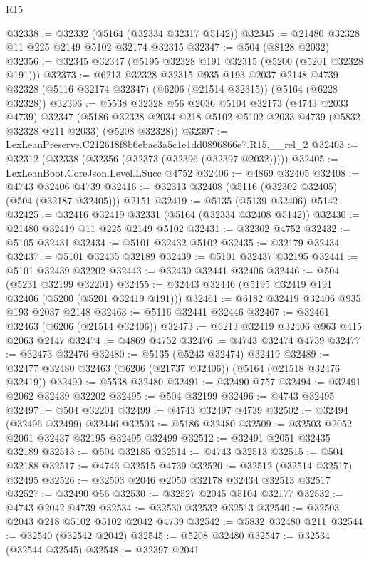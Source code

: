 \begin{lexlean}{R15}
\begin{coremodule}
{{{{{{{{{{{@32338 := @32332 (@5164 (@32334 @32317 @5142))
@32345 := @21480 @32328 @11 @225 @2149 @5102 @32174 @32315
@32347 := @504 (@8128 @2032)
@32356 := @32345 @32347 (@5195 @32328 @191 @32315 (@5200 (@5201 @32328 @191)))
@32373 := @6213
    @32328
    @32315
    @935
    @193
    @2037
    @2148
    @4739
    @32328
    (@5116 @32174 @32347)
    (@6206 (@21514 @32315))
    (@5164 (@6228 @32328))
@32396 := @5538
    @32328
    @56
    @2036
    @5104
    @32173
    (@4743 @2033 @4739)
    @32347
    (@5186 @32328 @2034 @218 @5102 @5102 @2033 @4739 (@5832 @32328 @211 @2033) (@5208 @32328))
@32397 := LexLeanPreserve.C212618f8b6ebac3a5c1e1dd0896866e7.R15.__rel_2
@32403 := @32312 (@32338 (@32356 (@32373 (@32396 (@32397 @2032)))))
@32405 := LexLeanBoot.CoreJson.Level.LSucc @4752
@32406 := @4869 @32405
@32408 := @4743 @32406 @4739
@32416 := @32313 @32408 (@5116 (@32302 @32405) (@504 (@32187 @32405))) @2151
@32419 := @5135 (@5139 @32406) @5142
@32425 := @32416 @32419 @32331 (@5164 (@32334 @32408 @5142))
@32430 := @21480 @32419 @11 @225 @2149 @5102
@32431 := @32302 @4752
@32432 := @5105 @32431
@32434 := @5101 @32432 @5102
@32435 := @32179 @32434
@32437 := @5101 @32435 @32189
@32439 := @5101 @32437 @32195
@32441 := @5101 @32439 @32202
@32443 := @32430 @32441 @32406
@32446 := @504 (@5231 @32199 @32201)
@32455 := @32443 @32446 (@5195 @32419 @191 @32406 (@5200 (@5201 @32419 @191)))
@32461 := @6182 @32419 @32406 @935 @193 @2037 @2148
@32463 := @5116 @32441 @32446
@32467 := @32461 @32463 (@6206 (@21514 @32406))
@32473 := @6213 @32419 @32406 @963 @415 @2063 @2147
@32474 := @4869 @4752
@32476 := @4743 @32474 @4739
@32477 := @32473 @32476
@32480 := @5135 (@5243 @32474) @32419
@32489 := @32477 @32480 @32463 (@6206 (@21737 @32406)) (@5164 (@21518 @32476 @32419))
@32490 := @5538 @32480
@32491 := @32490 @757
@32494 := @32491 @2062 @32439 @32202
@32495 := @504 @32199
@32496 := @4743 @32495
@32497 := @504 @32201
@32499 := @4743 @32497 @4739
@32502 := @32494 (@32496 @32499) @32446
@32503 := @5186 @32480
@32509 := @32503 @2052 @2061 @32437 @32195 @32495 @32499
@32512 := @32491 @2051 @32435 @32189
@32513 := @504 @32185
@32514 := @4743 @32513
@32515 := @504 @32188
@32517 := @4743 @32515 @4739
@32520 := @32512 (@32514 @32517) @32495
@32526 := @32503 @2046 @2050 @32178 @32434 @32513 @32517
@32527 := @32490 @56
@32530 := @32527 @2045 @5104 @32177
@32532 := @4743 @2042 @4739
@32534 := @32530 @32532 @32513
@32540 := @32503 @2043 @218 @5102 @5102 @2042 @4739
@32542 := @5832 @32480 @211
@32544 := @32540 (@32542 @2042)
@32545 := @5208 @32480
@32547 := @32534 (@32544 @32545)
@32548 := @32397 @2041
}}}}}}}}}}}
\end{coremodule}
\end{lexlean}
